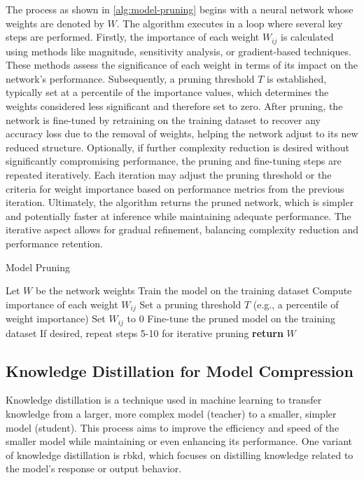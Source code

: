 \documentclass{ioereport}
\begin{document}
    The process as shown in \autoref{alg:model-pruning} begins with a neural network whose weights are denoted by \( W \). The algorithm executes in a loop where several key steps are performed. Firstly, the importance of each weight \( W_{ij} \) is calculated using methods like magnitude, sensitivity analysis, or gradient-based techniques. These methods assess the significance of each weight in terms of its impact on the network’s performance. Subsequently, a pruning threshold \( T \) is established, typically set at a percentile of the importance values, which determines the weights considered less significant and therefore set to zero. After pruning, the network is fine-tuned by retraining on the training dataset to recover any accuracy loss due to the removal of weights, helping the network adjust to its new reduced structure. Optionally, if further complexity reduction is desired without significantly compromising performance, the pruning and fine-tuning steps are repeated iteratively. Each iteration may adjust the pruning threshold or the criteria for weight importance based on performance metrics from the previous iteration. Ultimately, the algorithm returns the pruned network, which is simpler and potentially faster at inference while maintaining adequate performance. The iterative aspect allows for gradual refinement, balancing complexity reduction and performance retention.

    \begin{algorithm}[H]
        \caption{Model Pruning}
        \label{alg:model-pruning}
        \begin{algorithmic}[1]
            \State Let $W$ be the network weights
            \State Train the model on the training dataset
            \Loop
                \State Compute importance of each weight $W_{ij}$
                \State Set a pruning threshold $T$ (e.g., a percentile of weight importance)
                        \State Set $W_{ij}$ to 0
                    \EndIf
                \EndFor
                \State Fine-tune the pruned model on the training dataset
                \State If desired, repeat steps 5-10 for iterative pruning
            \EndLoop
            \State \textbf{return} $W$
            \EndProcedure
        \end{algorithmic}
    \end{algorithm}

    \subsection{Knowledge Distillation for Model Compression}
    Knowledge distillation is a technique used in machine learning to transfer knowledge from a larger, more complex model (teacher) to a smaller, simpler model (student). This process aims to improve the efficiency and speed of the smaller model while maintaining or even enhancing its performance. One variant of knowledge distillation is \gls{rbkd}, which focuses on distilling knowledge related to the model's response or output behavior.
\end{document}
